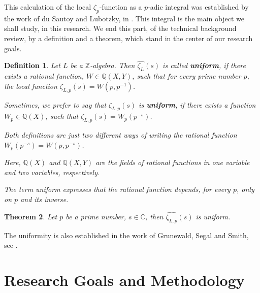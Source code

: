 \documentclass[12pt]{article}
\newtheorem{theorem}{Theorem}[subsection]
\newtheorem{definition}[theorem]{Definition}
\begin{document}
This calculation of the local $\zeta_p$-function as a $p$-adic integral was established by the work of du Sautoy and Lubotzky, in \cite{DuSautoyLubotzky}.
This integral is the main object we shall study, in this research.
We end this part, of the technical background review, by a definition and a theorem, which stand in the center of our research goals.
\begin{definition}
Let $L$ be a $\mathbb{Z}$-algebra. Then $\hat{\zeta_L}(s)$ is called \textbf{uniform}, if there exists a rational function, $W\in\mathbb{Q}(X,Y)$, such that for every prime number $p$, the local function $\zeta_{L,p}(s)=W(p,p^{-1})$.\par 
Sometimes, we prefer to say that $\zeta_{L,p}(s)$ is \textbf{uniform}, if there exists a function $W_p\in\mathbb{Q}(X)$, such that $\zeta_{L,p}(s)=W_p(p^{-s})$.\par
Both definitions are just two different ways of writing the rational function $W_p(p^{-s})=W(p,p^{-s})$.\par
Here, $\mathbb{Q}(X)$ and $\mathbb{Q}(X,Y)$ are the fields of rational functions in one variable and two variables, respectively.\par
The term uniform expresses that the rational function depends, for every $p$, only on $p$ and its inverse.\par
\end{definition}
\begin{theorem}
\label{thm.rational.function}
Let $p$ be a prime number, $s\in\mathbb{C}$, then $\hat{\zeta_{L,p}}(s)$ is uniform. 
\end{theorem}
The uniformity is also established in the work of Grunewald, Segal and Smith, see \cite{GrunewaldSegalSmith}.
\section{Research Goals and Methodology}
\end{document}
